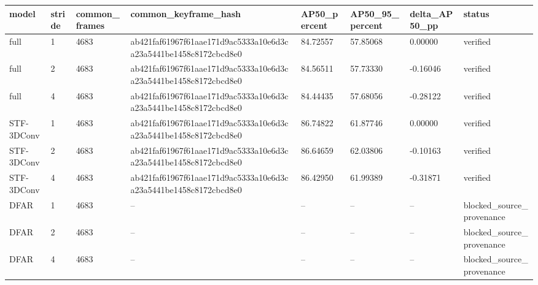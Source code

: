 \begin{tabular}{llllllll}
\hline
model & stride & common\_frames & common\_keyframe\_hash & AP50\_percent & AP50\_95\_percent & delta\_AP50\_pp & status \\
\hline
full & 1 & 4683 & ab421faf61967f61aae171d9ac5333a10e6d3ca23a5441be1458c8172cbcd8e0 & 84.72557 & 57.85068 & 0.00000 & verified \\
full & 2 & 4683 & ab421faf61967f61aae171d9ac5333a10e6d3ca23a5441be1458c8172cbcd8e0 & 84.56511 & 57.73330 & -0.16046 & verified \\
full & 4 & 4683 & ab421faf61967f61aae171d9ac5333a10e6d3ca23a5441be1458c8172cbcd8e0 & 84.44435 & 57.68056 & -0.28122 & verified \\
STF-3DConv & 1 & 4683 & ab421faf61967f61aae171d9ac5333a10e6d3ca23a5441be1458c8172cbcd8e0 & 86.74822 & 61.87746 & 0.00000 & verified \\
STF-3DConv & 2 & 4683 & ab421faf61967f61aae171d9ac5333a10e6d3ca23a5441be1458c8172cbcd8e0 & 86.64659 & 62.03806 & -0.10163 & verified \\
STF-3DConv & 4 & 4683 & ab421faf61967f61aae171d9ac5333a10e6d3ca23a5441be1458c8172cbcd8e0 & 86.42950 & 61.99389 & -0.31871 & verified \\
DFAR & 1 & 4683 & -- & -- & -- & -- & blocked\_source\_provenance \\
DFAR & 2 & 4683 & -- & -- & -- & -- & blocked\_source\_provenance \\
DFAR & 4 & 4683 & -- & -- & -- & -- & blocked\_source\_provenance \\
\hline
\end{tabular}
